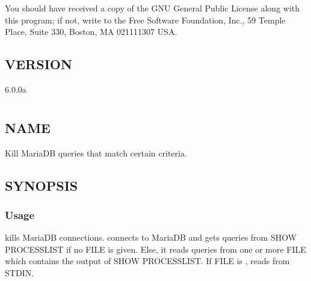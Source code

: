 \documentclass[letterpaper,10pt,english]{sphinxmanual}
\begin{document}
You should have received a copy of the GNU General Public License along with
this program; if not, write to the Free Software Foundation, Inc., 59 Temple
Place, Suite 330, Boston, MA  02111\sphinxhyphen{}1307  USA.


\section{VERSION}
\label{\detokenize{mariadb-iostat:version}}
 6.0.0a


\chapter{}
\label{\detokenize{mariadb-kill:mariadb-kill}}\label{\detokenize{mariadb-kill::doc}}

\section{NAME}
\label{\detokenize{mariadb-kill:name}}
 \sphinxhyphen{} Kill MariaDB queries that match certain criteria.


\section{SYNOPSIS}
\label{\detokenize{mariadb-kill:synopsis}}

\subsection{Usage}
\label{\detokenize{mariadb-kill:usage}}
\begin{sphinxVerbatim}[commandchars=\\\{\}]
 \PYG{p}{[}\PYG{p}{]} \PYG{p}{[}\PYG{p}{]}
\end{sphinxVerbatim}

 kills MariaDB connections.   connects to MariaDB and gets queries
from SHOW PROCESSLIST if no FILE is given.  Else, it reads queries from one
or more FILE which contains the output of SHOW PROCESSLIST.  If FILE is \sphinxhyphen{},
 reads from STDIN.
\end{document}

